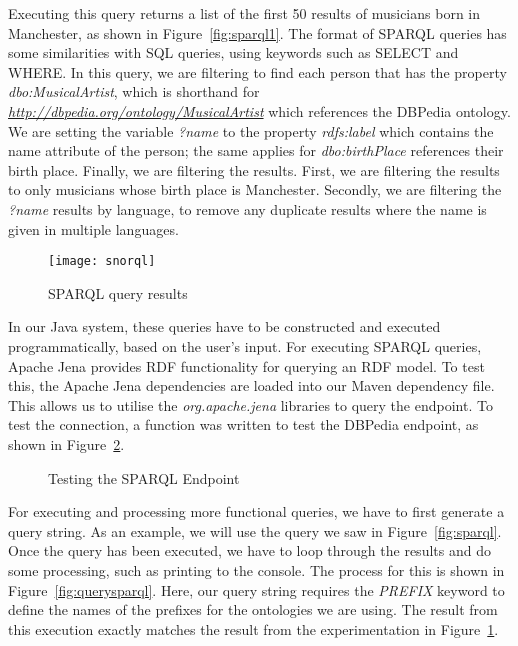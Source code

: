 Executing this query returns a list of the first 50 results of musicians born in Manchester, as shown in Figure~\ref{fig:sparql1}. The format of SPARQL queries has some similarities with SQL queries, using keywords such as SELECT and WHERE. In this query, we are filtering to find each person that has the property {\it{dbo:MusicalArtist}}, which is shorthand for {\it{\url{http://dbpedia.org/ontology/MusicalArtist}}} which references the DBPedia ontology. We are setting the variable {\it{?name}} to the property {\it{rdfs:label}} which contains the name attribute of the person; the same applies for {\it{dbo:birthPlace}} references their birth place. Finally, we are filtering the results. First, we are filtering the results to only musicians whose birth place is Manchester. Secondly, we are filtering the {\it{?name}} results by language, to remove any duplicate results where the name is given in multiple languages.

\begin{figure}[h]
	\centering
	\texttt{[image: snorql]}
	\caption{SPARQL query results}
	\label{fig:sparql2}
\end{figure}

In our Java system, these queries have to be constructed and executed programmatically, based on the user's input. For executing SPARQL queries, Apache Jena \cite{apachejena} provides RDF functionality for querying an RDF model. To test this, the Apache Jena dependencies are loaded into our Maven dependency file. This allows us to utilise the {\it{org.apache.jena}} libraries to query the endpoint. To test the connection, a function was written to test the DBPedia endpoint, as shown in Figure~\ref{fig:testrdf}.

\begin{figure}[h]
	\centering
	\qquad
	\caption{Testing the SPARQL Endpoint}
	\label{fig:testrdf}
\end{figure}

For executing and processing more functional queries, we have to first generate a query string. As an example, we will use the query we saw in Figure~\ref{fig:sparql}. Once the query has been executed, we have to loop through the results and do some processing, such as printing to the console. The process for this is shown in Figure~\ref{fig:querysparql}. Here, our query string requires the {\it{PREFIX}} keyword to define the names of the prefixes for the ontologies we are using. The result from this execution exactly matches the result from the experimentation in Figure~\ref{fig:sparql2}.

